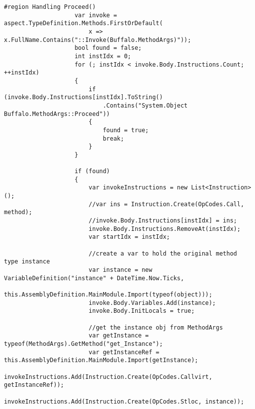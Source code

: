 \begin{lstlisting}[caption={../buffalo/Injectors/MethodAroundInjector.cs}, label=../buffalo/Injectors/MethodAroundInjector.cs, frame=tb, basicstyle=\scriptsize]
                    #region Handling Proceed()
                    var invoke = aspect.TypeDefinition.Methods.FirstOrDefault(
                        x => x.FullName.Contains("::Invoke(Buffalo.MethodArgs)"));
                    bool found = false;
                    int instIdx = 0;
                    for (; instIdx < invoke.Body.Instructions.Count; ++instIdx)
                    {
                        if (invoke.Body.Instructions[instIdx].ToString()
                            .Contains("System.Object Buffalo.MethodArgs::Proceed"))
                        {
                            found = true;
                            break;
                        }
                    }

                    if (found)
                    {
                        var invokeInstructions = new List<Instruction>();
                        //var ins = Instruction.Create(OpCodes.Call, method);
                        //invoke.Body.Instructions[instIdx] = ins;
                        invoke.Body.Instructions.RemoveAt(instIdx);
                        var startIdx = instIdx;

                        //create a var to hold the original method type instance
                        var instance = new VariableDefinition("instance" + DateTime.Now.Ticks,
                            this.AssemblyDefinition.MainModule.Import(typeof(object)));
                        invoke.Body.Variables.Add(instance);
                        invoke.Body.InitLocals = true;

                        //get the instance obj from MethodArgs
                        var getInstance = typeof(MethodArgs).GetMethod("get_Instance");
                        var getInstanceRef = this.AssemblyDefinition.MainModule.Import(getInstance);
                        invokeInstructions.Add(Instruction.Create(OpCodes.Callvirt, getInstanceRef));
                        invokeInstructions.Add(Instruction.Create(OpCodes.Stloc, instance));


\end{lstlisting}
